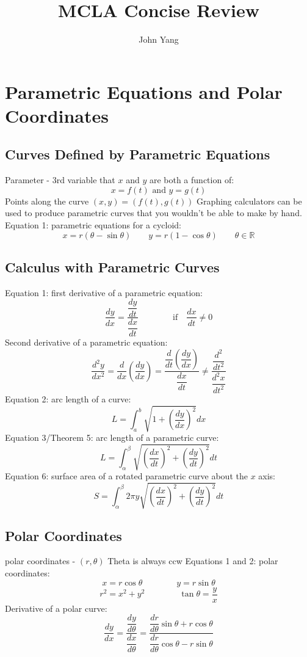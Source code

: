 \documentclass{article}
\title{MCLA Concise Review} %
\author{John Yang}
\begin{document}
    \maketitle
    \tableofcontents\newpage
    
    \section{Parametric Equations and Polar Coordinates} %
    \begin{multicols}{2}
    \subsection{Curves Defined by Parametric Equations} %
    \begin{outline}
        \1 Parameter - 3rd variable that $x$ and $y$ are both a function of: \[x=f(t)\text{ and }y=g(t)\]
        \1 Points along the curve \((x,y)=(f(t),g(t))\)
        \1 Graphing calculators can be used to produce parametric curves that you wouldn't be able to make by hand. 
        \1 Equation 1: parametric equations for a cycloid: \[x=r(\theta-\sin\theta) \qquad y=r(1-\cos\theta) \qquad \theta\in\mathbb{R}\]
    \end{outline}
    \subsection{Calculus with Parametric Curves}
    \begin{outline}
        \1 Equation 1: first derivative of a parametric equation: \[\dfrac{dy}{dx}=\dfrac{\dfrac{dy}{dt}}{\dfrac{dx}{dt}}\qquad\qquad\text{if}\quad\dfrac{dx}{dt}\neq0\]
        \1 Second derivative of a parametric equation: \[\dfrac{d^2y}{dx^2}=\dfrac{d}{dx}\left(\dfrac{dy}{dx}\right)=\dfrac{\dfrac{d}{dt}\left(\dfrac{dy}{dx}\right)}{\dfrac{dx}{dt}}\neq\dfrac{\dfrac{d^2}{dt^2}}{\dfrac{d^2x}{dt^2}}\]
        \1 Equation 2: arc length of a curve: \[L=\int^b_a\sqrt{1+\left(\dfrac{dy}{dx}\right)^2}dx\]
        \1 Equation 3/Theorem 5: arc length of a parametric curve: \[L=\int^\beta_\alpha\sqrt{\left(\dfrac{dx}{dt}\right)^2+\left(\dfrac{dy}{dt}\right)^2}dt\]
        \1 Equation 6: surface area of a rotated parametric curve about the $x$ axis: \[S=\int^\beta_\alpha2\pi y\sqrt{\left(\dfrac{dx}{dt}\right)^2+\left(\dfrac{dy}{dt}\right)^2}dt\]

    \end{outline}
    \subsection{Polar Coordinates}
    \begin{outline}
        \1 polar coordinates - \((r,\theta)\)
        \1 Theta is always ccw 
        \1 Equations 1 and 2: polar coordinates: \[x=r\cos\theta\qquad\qquad y=r\sin\theta\]\[r^2=x^2+y^2\qquad\qquad\tan\theta=\dfrac{y}{x}\]
        \1 Derivative of a polar curve: \[\dfrac{dy}{dx}=\dfrac{\dfrac{dy}{d\theta}}{\dfrac{dx}{d\theta}}=\dfrac{\dfrac{dr}{d\theta}\sin\theta+r\cos\theta}{\dfrac{dr}{d\theta}\cos\theta-r\sin\theta}\]
    \end{outline}

\end{multicols}
\end{document}
